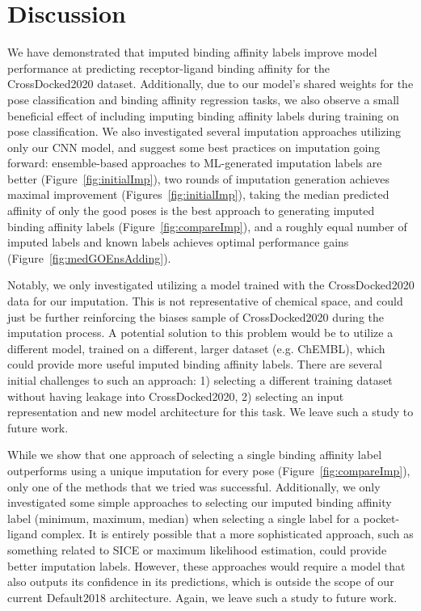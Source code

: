 \documentclass[journal=jmcmar,manuscript=article]{achemso}
\begin{document}
\section{Discussion}
We have demonstrated that imputed binding affinity labels improve model performance at predicting receptor-ligand binding affinity for the CrossDocked2020 dataset.
Additionally, due to our model's shared weights for the pose classification and binding affinity regression tasks, we also observe a small beneficial effect of including imputing binding affinity labels during training on pose classification.
We also investigated several imputation approaches utilizing only our CNN model, and suggest some best practices on imputation going forward: ensemble-based approaches to ML-generated imputation labels are better (Figure~\ref{fig:initialImp}), two rounds of imputation generation achieves maximal improvement (Figures~\ref{fig:initialImp}), taking the median predicted affinity of only the good poses is the best approach to generating imputed binding affinity labels (Figure~\ref{fig:compareImp}), and a roughly equal number of imputed labels and known labels achieves optimal performance gains (Figure~\ref{fig:medGOEnsAdding}).

Notably, we only investigated utilizing a model trained with the CrossDocked2020 data for our imputation.
This is not representative of chemical space, and could just be further reinforcing the biases sample of CrossDocked2020 during the imputation process.
A potential solution to this problem would be to utilize a different model, trained on a different, larger dataset (e.g. ChEMBL\cite{Chembl}), which could provide more useful imputed binding affinity labels.
There are several initial challenges to such an approach: 1) selecting a different training dataset without having leakage into CrossDocked2020, 2) selecting an input representation and new model architecture for this task.
We leave such a study to future work.

While we show that one approach of selecting a single binding affinity label outperforms using a unique imputation for every pose (Figure~\ref{fig:compareImp}), only one of the methods that we tried was successful.
Additionally, we only investigated some simple approaches to selecting our imputed binding affinity label (minimum, maximum, median) when selecting a single label for a pocket-ligand complex.
It is entirely possible that a more sophisticated approach, such as something related to SICE\cite{SICE} or maximum likelihood estimation, could provide better imputation labels.
However, these approaches would require a model that also outputs its confidence in its predictions, which is outside the scope of our current Default2018 architecture.
Again, we leave such a study to future work.
\end{document}
